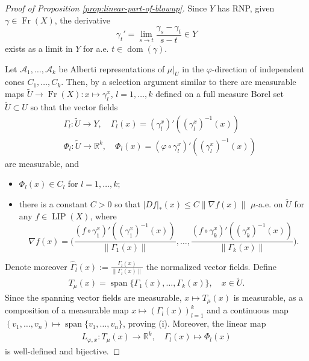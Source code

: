 \documentclass{amsart}
\numberwithin{equation}{section}
\newcommand{\R}{\mathbb{R}}
\newcommand{\LIP}{\operatorname{LIP}}
\newcommand{\dom}{\operatorname{dom}}
\newcommand{\Fr}{\operatorname{Fr}}
\newcommand{\inv}{^{-1}}
\begin{document}
\begin{proof}[Proof of Proposition \ref{prop:linear-part-of-blowup}]
Since $Y$ has RNP, given $\gamma\in\Fr(X)$, the derivative 
\[
\gamma_t'=\lim_{s\to t}\frac{\gamma_{s}-\gamma_t}{s-t}\in Y
\]
exists as a limit in $Y$ for a.e. $t\in \dom(\gamma)$. 
    
Let $\mathscr A_1,\ldots,\mathscr A_k$ be Alberti representations of $\mu|_U$ in the $\varphi$-direction of independent cones $C_1,\ldots, C_k$. Then, by a selection argument similar to \cite[Proposition 2.9]{bate12diff} there are measurable maps $\widetilde U\to\Fr(X):x\mapsto \gamma^x_l$, $l=1,\ldots,k$ defined on a full measure Borel set $\widetilde U\subset U$ so that the vector fields
\begin{align*}
&\Gamma_l:\widetilde U\to Y,\quad \Gamma_l(x)= (\gamma_l^x)'((\gamma_l^x)\inv(x))\\
&\Phi_l:\widetilde U\to \R^k,\quad \Phi_l(x)= (\varphi\circ \gamma_l^x)'((\gamma_l^x)\inv(x))
\end{align*}
are measurable, and 
\begin{itemize}
	\item $\Phi_l(x)\in C_l$ for $l=1,\ldots,k$;
	\item there is a constant $C>0$ so that $|Df|_\ast(x)\le C\|\nabla f(x)\|$ $\mu$-a.e. on $\widetilde U$ for any $f\in \LIP(X)$, where
	\[
	\nabla f(x)=\Big(\frac{(f\circ\gamma_1^x)'((\gamma_1^x)\inv(x))}{\|\Gamma_1(x)\|},\ldots,\frac{(f\circ\gamma_k^x)'((\gamma_k^x)\inv(x))}{\|\Gamma_k(x)\|}\Big).
	\]
\end{itemize}
Denote moreover $\widehat\Gamma_l(x):=\frac{\Gamma_l(x)}{\|\Gamma_l(x)\|}$ the normalized vector fields. Define
\begin{align}\label{eq:span}
T_\mu(x)=\operatorname{span}\{\Gamma_1(x),\ldots, \Gamma_k(x) \},\quad x\in \widetilde U.
\end{align}
Since the spanning vector fields are measurable, $x\mapsto T_\mu(x)$ is measurable, as a composition of a measurable map $x\mapsto (\Gamma_l(x))_{l=1}^k$ and a continuous map $(v_1,\dots, v_n)\mapsto \operatorname{span}\{v_1,\dots, v_n \}$, proving (i). Moreover, the linear map 
\begin{align}\label{eq:lin-map}
L_{\varphi,x}:T_\mu(x)\to \R^k,\quad \Gamma_l(x)\mapsto \Phi_l(x)
\end{align}
is well-defined and bijective.


\end{proof}
\end{document}
